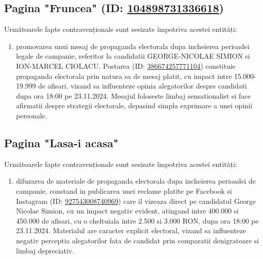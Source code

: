 \documentclass[a4paper,12pt]{article}
\begin{document}
\vspace{0.5cm}

\subsection{Pagina "Fruncea" (ID: \href{https://www.facebook.com/ads/library/?id=104898731336618}{104898731336618})}
Următoarele fapte contravenționale sunt sesizate împotriva acestei entități:

\begin{enumerate}[leftmargin=*, label=\arabic*.)]
    \item promovarea unui mesaj de propaganda electorala dupa incheierea perioadei legale de campanie, referitor la candidatii GEORGE-NICOLAE SIMION si ION-MARCEL CIOLACU. Postarea (ID: \href{https://www.facebook.com/ads/library/?id=386674257771104}{386674257771104}) constituie propaganda electorala prin natura sa de mesaj platit, cu impact intre 15.000-19.999 de afisari, vizand sa influenteze opinia alegatorilor despre candidati dupa ora 18:00 pe 23.11.2024. Mesajul foloseste limbaj sensationalist si face afirmatii despre strategii electorale, depasind simpla exprimare a unei opinii personale.
\end{enumerate}

\vspace{0.5cm}

\subsection{Pagina "Lasa-i acasa"}
Următoarele fapte contravenționale sunt sesizate împotriva acestei entități:

\begin{enumerate}[leftmargin=*, label=\arabic*.)]
    \item difuzarea de materiale de propaganda electorala dupa incheierea perioadei de campanie, constand in publicarea unei reclame platite pe Facebook si Instagram (ID: \href{https://www.facebook.com/ads/library/?id=927543008740969}{927543008740969}) care il vizeaza direct pe candidatul George Nicolae Simion, cu un impact negativ evident, atingand intre 400.000 si 450.000 de afisari, cu o cheltuiala intre 2.500 si 3.000 RON, dupa ora 18:00 pe 23.11.2024. Materialul are caracter explicit electoral, vizand sa influenteze negativ perceptia alegatorilor fata de candidat prin comparatii denigratoare si limbaj depreciativ.
\end{enumerate}

\vspace{0.5cm}
\end{document}
